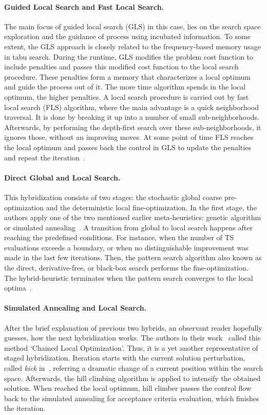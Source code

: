 \paragraph{Guided Local Search and Fast Local Search.}
The main focus of guided local search (GLS) in this case, lies on the search space exploration and the guidance of process using incubated information. To some extent, the GLS approach is closely related to the frequency-based memory usage in tabu search. During the runtime, GLS modifies the problem cost function to include penalties and passes this modified cost function to the local search procedure. These penalties form a memory that characterizes a local optimum and guide the process out of it. The more time algorithm spends in the local optimum, the higher penalties. A local search procedure is carried out by fast local search (FLS) algorithm, where the main advantage is a quick neighborhood traversal. It is done by breaking it up into a number of small sub-neighborhoods. Afterwards, by performing the depth-first search over these sub-neighborhoods, it ignores those, without an improving moves. At some point of time FLS reaches the local optimum and passes back the control in GLS to update the penalties and repeat the iteration~\cite{tsang1997fast}.

\paragraph{Direct Global and Local Search.}
This hybridization consists of two stages: the stochastic global coarse pre-optimization and the deterministic local fine-optimization. In the first stage, the authors apply one of the two mentioned earlier meta-heuristics: genetic algorithm or simulated annealing~\cite{hooke1961direct}. A transition from global to local search happens after reaching the predefined conditions. For instance, when the number of TS evaluations exceeds a boundary, or when no distinguishable improvement was made in the last few iterations. Then, the pattern search algorithm also known as the direct, derivative-free, or black-box search performs the fine-optimization. The hybrid-heuristic terminates when the pattern search converges to the local optima~\cite{syrjakow1999efficient}.

\paragraph{Simulated Annealing and Local Search.}
After the brief explanation of previous two hybrids, an observant reader hopefully guesses, how the next hybridization works.
The authors in their work~\cite{martin1996combining} called this method `Chained Local Optimization'. Thus, it is a yet another representative of staged hybridization.
Iteration starts with the current solution perturbation, called \emph{kick} in~\cite{martin1996combining}, referring a dramatic change of a current position within the search space. Afterwards, the hill climbing algorithm is applied to intensify the obtained solution. When reached the local optimum, hill climber passes the control flow back to the simulated annealing for acceptance criteria evaluation, which finishes the iteration.

